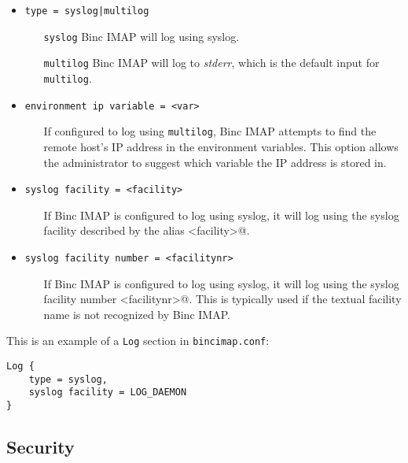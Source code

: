 \documentclass[11pt,a4paper,twoside,openright]{report}
\begin{document}
\begin{itemize}

\item \texttt{type = syslog{|}multilog}
  \begin{itemize}
  \item [\texttt{syslog}] Binc IMAP will log using syslog.
  \item [\texttt{multilog}] Binc IMAP will log to \textit{stderr},
    which is the default input for \texttt{multilog}.
  \end{itemize}

\item \texttt{environment ip variable = <var>}
  \begin{itemize}
  \item [] If configured to log using \texttt{multilog}, Binc IMAP
    attempts to find the remote host's IP address in the environment
    variables.  This option allows the administrator to suggest which
    variable the IP address is stored in.
  \end{itemize}

\item \texttt{syslog facility = <facility>}
  \begin{itemize}
    \item [] If Binc IMAP is configured to log using syslog, it will
      log using the syslog facility described by the alias
      \Verb@<facility>@.
  \end{itemize}

\item \texttt{syslog facility number = <facilitynr>}
  \begin{itemize}
    \item [] If Binc IMAP is configured to log using syslog, it will
      log using the syslog facility number \Verb@<facilitynr>@. This
      is typically used if the textual facility name is not recognized
      by Binc IMAP.
  \end{itemize}
\end{itemize}
This is an example of a \texttt{Log} section in
\texttt{bincimap.conf}:

\begin{Verbatim}
Log {
    type = syslog,
    syslog facility = LOG_DAEMON
}
\end{Verbatim}

\subsection{Security}
\end{document}
